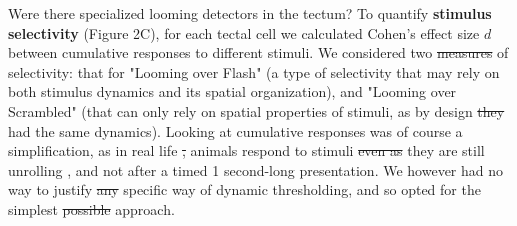 \documentclass{article}
\providecommand{\DIFaddtex}[1]{{\protect\color{blue}{#1}}} %
\providecommand{\DIFdeltex}[1]{{\protect\color{red}\sout{#1}}}                      %
\providecommand{\DIFaddbegin}{} %
\providecommand{\DIFaddend}{} %
\providecommand{\DIFdelbegin}{} %
\providecommand{\DIFdelend}{} %
\providecommand{\DIFadd}[1]{\texorpdfstring{\DIFaddtex{#1}}{#1}} %
\providecommand{\DIFdel}[1]{\texorpdfstring{\DIFdeltex{#1}}{}} %
\newcommand{\DIFscaledelfig}{0.5}
\newlength{\DIFdelgraphicswidth} %
\newlength{\DIFdelgraphicsheight} %
\newcommand{\DIFaddincludegraphics}[2][]{{\color{blue}\fbox{\DIFOincludegraphics[#1]{#2}}}} %
\newcommand{\DIFdelincludegraphics}[2][]{%
\sbox{\DIFdelgraphicsbox}{\DIFOincludegraphics[#1]{#2}}%
\settoboxwidth{\DIFdelgraphicswidth}{\DIFdelgraphicsbox} %
\settoboxtotalheight{\DIFdelgraphicsheight}{\DIFdelgraphicsbox} %
\scalebox{\DIFscaledelfig}{%
\parbox[b]{\DIFdelgraphicswidth}{\usebox{\DIFdelgraphicsbox}\\[-\baselineskip] \rule{\DIFdelgraphicswidth}{0em}}\llap{\resizebox{\DIFdelgraphicswidth}{\DIFdelgraphicsheight}{%
\setlength{\unitlength}{\DIFdelgraphicswidth}%
\begin{picture}(1,1)%
\thicklines\linethickness{2pt} %
{\color[rgb]{1,0,0}\put(0,0){\framebox(1,1){}}}%
{\color[rgb]{1,0,0}\put(0,0){\line( 1,1){1}}}%
{\color[rgb]{1,0,0}\put(0,1){\line(1,-1){1}}}%
\end{picture}%
}\hspace*{3pt}}} %
} %
\DeclareRobustCommand{\DIFaddbegin}{\DIFOaddbegin \let\includegraphics\DIFaddincludegraphics} %
\DeclareRobustCommand{\DIFaddend}{\DIFOaddend \let\includegraphics\DIFOincludegraphics} %
\DeclareRobustCommand{\DIFdelbegin}{\DIFOdelbegin \let\includegraphics\DIFdelincludegraphics} %
\DeclareRobustCommand{\DIFdelend}{\DIFOaddend \let\includegraphics\DIFOincludegraphics} %
\begin{document}
Were there specialized looming detectors in the tectum? To quantify \textbf{stimulus selectivity} (Figure 2C), for each tectal cell we calculated Cohen’s effect size $d$ between cumulative responses to different stimuli. We considered two \DIFdelbegin \DIFdel{measures }\DIFdelend \DIFaddbegin \DIFadd{types }\DIFaddend of selectivity: that for "Looming over Flash" (a type of selectivity that may rely on both stimulus dynamics and its spatial organization), and "Looming over Scrambled" (that can only rely on spatial properties of stimuli, as by design \DIFdelbegin \DIFdel{they }\DIFdelend \DIFaddbegin \DIFadd{Looming and Scrambled stimuli }\DIFaddend had the same dynamics). Looking at cumulative responses was of course a simplification, as in real life \DIFdelbegin \DIFdel{, }\DIFdelend animals respond to stimuli \DIFdelbegin \DIFdel{even as }\DIFdelend \DIFaddbegin \DIFadd{while }\DIFaddend they are still unrolling \citep{peron2009adaptation, khakhalin2014}, and not after a timed 1 second-long presentation. We however had no way to justify \DIFdelbegin \DIFdel{any }\DIFdelend \DIFaddbegin \DIFadd{a }\DIFaddend specific way of dynamic thresholding, and so opted for the simplest \DIFdelbegin \DIFdel{possible }\DIFdelend approach.
\end{document}
